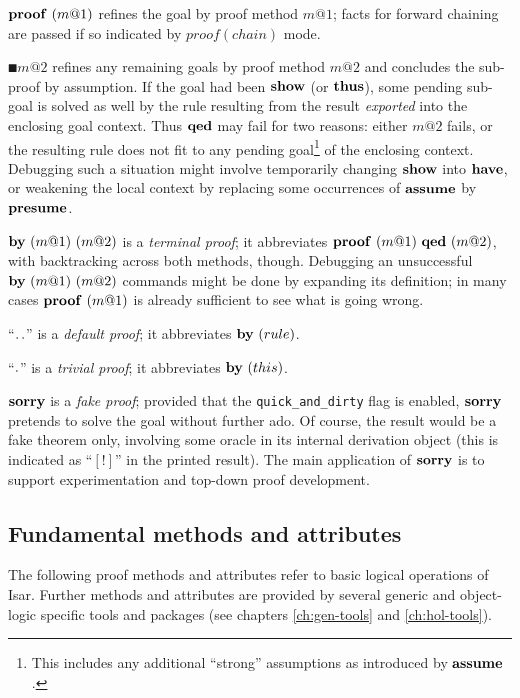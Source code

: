 \begin{descr}
\item [$\PROOF{m@1}$] refines the goal by proof method $m@1$; facts for
  forward chaining are passed if so indicated by $proof(chain)$ mode.
\item [$\QED{m@2}$] refines any remaining goals by proof method $m@2$ and
  concludes the sub-proof by assumption.  If the goal had been ${\mathord{\mathbf{show}}}$ (or
  ${\mathord{\mathbf{thus}}}$), some pending sub-goal is solved as well by the rule resulting
  from the result \emph{exported} into the enclosing goal context.  Thus
  ${\mathord{\mathbf{qed}}}$ may fail for two reasons: either $m@2$ fails, or the resulting
  rule does not fit to any pending goal\footnote{This includes any additional
    ``strong'' assumptions as introduced by ${\mathord{\mathbf{assume}}}$.} of the enclosing
  context.  Debugging such a situation might involve temporarily changing
  ${\mathord{\mathbf{show}}}$ into ${\mathord{\mathbf{have}}}$, or weakening the local context by replacing
  some occurrences of ${\mathord{\mathbf{assume}}}$ by ${\mathord{\mathbf{presume}}}$.
\item [$\BYY{m@1}{m@2}$] is a \emph{terminal proof}; it
  abbreviates $\PROOF{m@1}~\QED{m@2}$, with backtracking across both methods,
  though.  Debugging an unsuccessful $\BYY{m@1}{m@2}$ commands might be done
  by expanding its definition; in many cases $\PROOF{m@1}$ is already
  sufficient to see what is going wrong.
\item [``${\mathord{\mathbf{.\,.}}}$''] is a \emph{default proof}; it
  abbreviates $\BY{rule}$.
\item [``${\mathord{\mathbf{.}}}$''] is a \emph{trivial proof}; it
  abbreviates $\BY{this}$.
\item [${\mathord{\mathbf{sorry}}}$] is a \emph{fake proof}; provided that the
  \texttt{quick_and_dirty} flag is enabled, ${\mathord{\mathbf{sorry}}}$ pretends to solve the
  goal without further ado.  Of course, the result would be a fake theorem
  only, involving some oracle in its internal derivation object (this is
  indicated as ``$[!]$'' in the printed result).  The main application of
  ${\mathord{\mathbf{sorry}}}$ is to support experimentation and top-down proof development.
\end{descr}


\subsection{Fundamental methods and attributes}\label{sec:pure-meth-att}

The following proof methods and attributes refer to basic logical operations
of Isar.  Further methods and attributes are provided by several generic and
object-logic specific tools and packages (see chapters \ref{ch:gen-tools} and
\ref{ch:hol-tools}).

